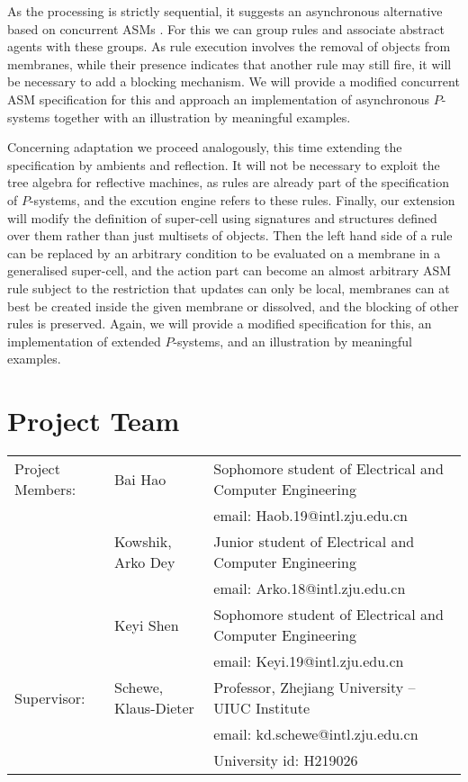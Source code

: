 \documentclass[11pt]{llncs}
\begin{document}
As the processing is strictly sequential, it suggests an asynchronous alternative based on concurrent ASMs \cite{boerger:ai2016}. For this we can group rules and associate abstract agents with these groups. As rule execution involves the removal of objects from membranes, while their presence indicates that another rule may still fire, it will be necessary to add a blocking mechanism. We will provide a modified concurrent ASM specification for this and approach an implementation of asynchronous $P$-systems together with an illustration by meaningful examples.

Concerning adaptation we proceed analogously, this time extending the specification by ambients and reflection. It will not be necessary to exploit the tree algebra for reflective machines, as rules are already part of the specification of $P$-systems, and the excution engine refers to these rules. Finally, our extension will modify the definition of super-cell using signatures and structures defined over them rather than just multisets of objects. Then the left hand side of a rule can be replaced by an arbitrary condition to be evaluated on a membrane in a generalised super-cell, and the action part can become an almost arbitrary ASM rule subject to the restriction that updates can only be local, membranes can at best be created inside the given membrane or dissolved, and the blocking of other rules is preserved. Again, we will provide a modified specification for this, an implementation of extended $P$-systems, and an illustration by meaningful examples.

\section{Project Team}

\begin{tabular}{l@{\quad}p{3.7cm}@{\quad}p{8cm}}
Project Members: & Bai Hao & Sophomore student of Electrical and Computer Engineering \\
&& email: Haob.19@intl.zju.edu.cn \\
& Kowshik, Arko Dey & Junior student of Electrical and Computer Engineering \\
&& email: Arko.18@intl.zju.edu.cn \\
& Keyi Shen & Sophomore student of Electrical and Computer Engineering \\
&& email: Keyi.19@intl.zju.edu.cn \\
Supervisor: & Schewe, Klaus-Dieter & Professor, Zhejiang University -- UIUC Institute \\
&& email: kd.schewe@intl.zju.edu.cn\\
&& University id: H219026\\[1ex]
\end{tabular}
\end{document}
